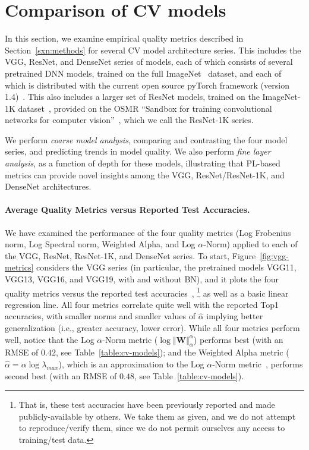 \vspace{-1mm}
\section{Comparison of CV models}
\label{sxn:cv}

In this section, we examine empirical quality metrics described in Section~\ref{sxn:methods} for several CV model architecture series.
This includes the VGG, ResNet, and DenseNet series of models, each of which consists of several pretrained DNN models, trained on the full ImageNet~\cite{imagenet} dataset, and each of which is distributed with the current open source pyTorch framework (version 1.4)~\cite{pytorch}.
This also includes a larger set of ResNet models, trained on the ImageNet-1K dataset~\cite{imagenet}, provided on the OSMR ``Sandbox for training convolutional networks for computer vision''~\cite{osmr}, which we call the ResNet-1K series.

We perform \emph{coarse model analysis}, comparing and contrasting the four model series, and predicting trends in model quality. 
We also perform \emph{fine layer analysis}, as a function of depth for these models, illustrating that PL-based metrics can provide novel insights among the VGG, ResNet/ResNet-1K, and DenseNet architectures. 


\vspace{-1mm}
\paragraph{Average Quality Metrics versus Reported Test Accuracies.}

We have examined the performance of the four quality metrics (Log Frobenius norm, Log Spectral norm, Weighted Alpha, and Log $\alpha$-Norm) applied to each of the VGG, ResNet, ResNet-1K, and DenseNet series.
To start, Figure~\ref{fig:vgg-metrics} considers the VGG series (in particular, the pretrained models VGG11, VGG13, VGG16, and VGG19, with and without BN), and it plots the four quality metrics versus the reported test accuracies~\cite{pytorch},%
\footnote{That is, these test accuracies have been previously reported and made publicly-available by others.  We take them as given, and we do not attempt to reproduce/verify them, since we do not permit ourselves any access to training/test data.}
as well as a basic linear regression line. 
All four metrics correlate quite well with the reported Top1 accuracies, with smaller norms and smaller values of $\hat{\alpha}$ implying better generalization (i.e., greater accuracy, lower error). 
While all four metrics perform well, notice that the Log $\alpha$-Norm metric ($\log\Vert\mathbf{W}\Vert_{\alpha}^{\alpha}$) performs best (with an RMSE of $0.42$, see Table~\ref{table:cv-models}); and the Weighted Alpha metric ($\hat\alpha =\alpha\log\lambda_{max} $), which is an approximation to the Log $\alpha$-Norm metric~\cite{MM20_unpub_work}, performs second best (with an RMSE of $0.48$, see Table~\ref{table:cv-models}).

